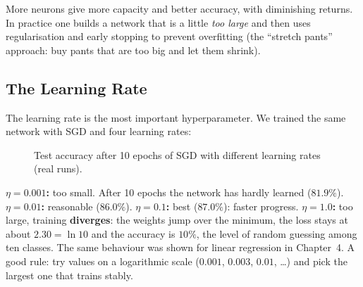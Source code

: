 \noindent More neurons give more capacity and better accuracy, with diminishing returns. In practice one builds a network that is a little \emph{too large} and then uses regularisation and early stopping to prevent overfitting (the ``stretch pants'' approach: buy pants that are too big and let them shrink).

\subsection{The Learning Rate}

The learning rate is the most important hyperparameter. We trained the same network with SGD and four learning rates:

\begin{figure}[!htbp]
\centering
{}
\caption{Test accuracy after 10 epochs of SGD with different learning rates (real runs).}\label{fig:lr}
\end{figure}

\begin{explain}
\textbf{$\eta=0.001$:} too small. After 10 epochs the network has hardly learned ($81.9\%$). \textbf{$\eta=0.01$:} reasonable ($86.0\%$). \textbf{$\eta=0.1$:} best ($87.0\%$): faster progress. \textbf{$\eta=1.0$:} too large, training \textbf{diverges}: the weights jump over the minimum, the loss stays at about $2.30=\ln10$ and the accuracy is $10\%$, the level of random guessing among ten classes. The same behaviour was shown for linear regression in Chapter~4. A good rule: try values on a logarithmic scale ($0.001$, $0.003$, $0.01$, \dots) and pick the largest one that trains stably.
\end{explain}

